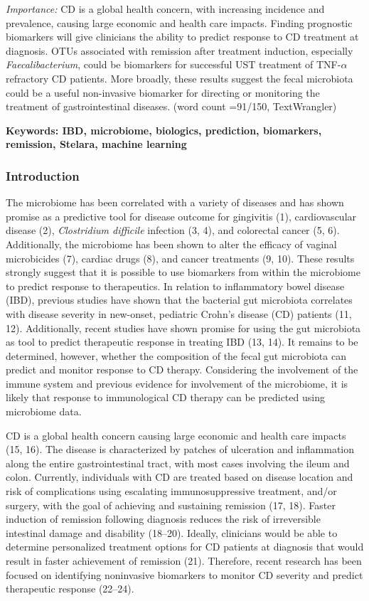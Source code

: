 \documentclass[12pt,]{article}
\begin{document}
\emph{Importance:} CD is a global health concern, with increasing
incidence and prevalence, causing large economic and health care
impacts. Finding prognostic biomarkers will give clinicians the ability
to predict response to CD treatment at diagnosis. OTUs associated with
remission after treatment induction, especially \emph{Faecalibacterium},
could be biomarkers for successful UST treatment of TNF-\({\alpha}\)
refractory CD patients. More broadly, these results suggest the fecal
microbiota could be a useful non-invasive biomarker for directing or
monitoring the treatment of gastrointestinal diseases. (word count
=91/150, TextWrangler)

\textbf{Keywords: IBD, microbiome, biologics, prediction, biomarkers,
remission, Stelara, machine learning}

\newpage

\subsubsection{Introduction}\label{introduction}

The microbiome has been correlated with a variety of diseases and has
shown promise as a predictive tool for disease outcome for gingivitis
(1), cardiovascular disease (2), \emph{Clostridium difficile} infection
(3, 4), and colorectal cancer (5, 6). Additionally, the microbiome has
been shown to alter the efficacy of vaginal microbicides (7), cardiac
drugs (8), and cancer treatments (9, 10). These results strongly suggest
that it is possible to use biomarkers from within the microbiome to
predict response to therapeutics. In relation to inflammatory bowel
disease (IBD), previous studies have shown that the bacterial gut
microbiota correlates with disease severity in new-onset, pediatric
Crohn's disease (CD) patients (11, 12). Additionally, recent studies
have shown promise for using the gut microbiota as tool to predict
therapeutic response in treating IBD (13, 14). It remains to be
determined, however, whether the composition of the fecal gut microbiota
can predict and monitor response to CD therapy. Considering the
involvement of the immune system and previous evidence for involvement
of the microbiome, it is likely that response to immunological CD
therapy can be predicted using microbiome data.

CD is a global health concern causing large economic and health care
impacts (15, 16). The disease is characterized by patches of ulceration
and inflammation along the entire gastrointestinal tract, with most
cases involving the ileum and colon. Currently, individuals with CD are
treated based on disease location and risk of complications using
escalating immunosuppressive treatment, and/or surgery, with the goal of
achieving and sustaining remission (17, 18). Faster induction of
remission following diagnosis reduces the risk of irreversible
intestinal damage and disability (18--20). Ideally, clinicians would be
able to determine personalized treatment options for CD patients at
diagnosis that would result in faster achievement of remission (21).
Therefore, recent research has been focused on identifying noninvasive
biomarkers to monitor CD severity and predict therapeutic response
(22--24).
\end{document}
